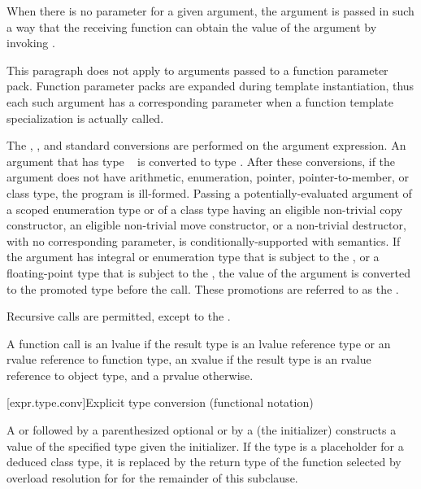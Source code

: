 \pnum
{}%
When there is no parameter for a given argument, the argument is passed
in such a way that the receiving function can obtain the value of the
argument by invoking .
\begin{note}
This paragraph does not apply to arguments passed to a function parameter pack.
Function parameter packs are expanded during template instantiation,
thus each such argument has a corresponding parameter when a function template
specialization is actually called.
\end{note}
The
, ,
and  standard conversions are
performed on the argument expression.
An argument that has type \cv{}~ is converted
to type .
After these conversions, if the
argument does not have arithmetic, enumeration, pointer, pointer-to-member,
or class type, the program is ill-formed. Passing a potentially-evaluated
argument
of a scoped enumeration type or
of a class type having an eligible non-trivial
copy constructor, an eligible non-trivial move constructor,
or a
non-trivial destructor,
with no corresponding parameter, is conditionally-supported with
 semantics. If the argument has
integral or enumeration type that is subject to the , or a floating-point type that is subject to the
, the value of the argument is converted to the
promoted type before the call. These promotions are referred to as
the .

\pnum
{}%
Recursive calls are permitted, except to the .

\pnum
A function call is an lvalue
if the result type is an lvalue reference type or an rvalue reference to function type,
an xvalue if the result type is an rvalue reference to object type, and a prvalue
otherwise.

[expr.type.conv]{Explicit type conversion (functional notation)}

\pnum
{}%
%
%
%
%
A  or
 followed
by a parenthesized optional  or
by a 
(the initializer)
constructs a value of the specified type
given the initializer.
%
If the type is a placeholder
for a deduced class type,
it is replaced by the return type
of the function selected by overload resolution
for 
for the remainder of this subclause.

